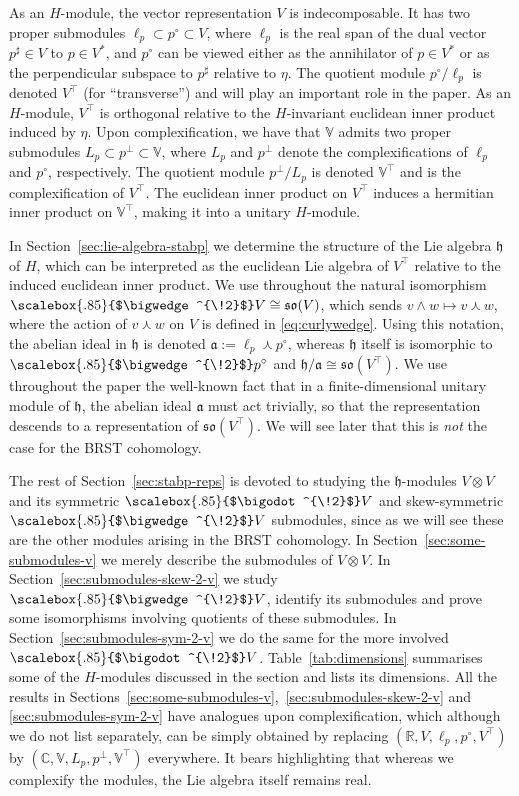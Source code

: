 \documentclass[11pt,reqno,a4paper,final]{amsart}
\newcommand\ext[1]{\scalebox{.85}{$\bigwedge^{\!#1}$}}
\newcommand\sym[1]{\scalebox{.85}{$\bigodot^{\!#1}$}}
\theoremstyle{plain}
\theoremstyle{definition}
\newcommand{\h}{\mathfrak{h}}
\newcommand{\fa}{\mathfrak{a}}
\newcommand{\so}{\mathfrak{so}}
\newcommand{\VV}{\mathbb{V}}
\newcommand{\RR}{\mathbb{R}}
\newcommand{\CC}{\mathbb{C}}
\newcommand{\1}{\mathbb{1}}
\numberwithin{equation}{section}
\begin{document}
As an $H$-module, the vector
representation $V$ is indecomposable. It has two proper submodules
$\ell_p \subset p^\circ \subset V$, where $\ell_p$ is the real span of
the dual vector $p^\sharp \in V$ to $p \in V^*$, and $p^\circ$ can be
viewed either as the annihilator of $p \in V^*$ or as the
perpendicular subspace to $p^\sharp$ relative to $\eta$. The quotient
module $p^\circ/\ell_p$ is denoted $V^\top$ (for ``transverse'') and
will play an important role in the paper. As an $H$-module, $V^\top$
is orthogonal relative to the $H$-invariant euclidean inner product
induced by $\eta$. Upon complexification, we have that $\VV$ admits
two proper submodules $L_p \subset p^\perp \subset \VV$, where $L_p$
and $p^\perp$ denote the complexifications of $\ell_p$ and $p^\circ$,
respectively. The quotient module $p^\perp/L_p$ is denoted $\VV^\top$
and is the complexification of $V^\top$. The euclidean inner product
on $V^\top$ induces a hermitian inner product on $\VV^\top$, making it
into a unitary $H$-module.

In Section~\ref{sec:lie-algebra-stabp} we determine the structure of
the Lie algebra $\h$ of $H$, which can be interpreted as the euclidean
Lie algebra of $V^\top$ relative to the induced euclidean inner
product.  We use throughout the natural isomorphism
$\ext{2}V \cong \so(V)$, which sends
$v \wedge w \mapsto v \curlywedge w$, where the action of
$v \curlywedge w$ on $V$ is defined in \eqref{eq:curlywedge}.  Using
this notation, the abelian ideal in $\h$ is denoted
$\fa:= \ell_p \curlywedge p^\circ$, whereas $\h$ itself is isomorphic
to $\ext{2}p^\circ$ and $\h/\fa \cong \so(V^\top)$.  We use throughout
the paper the well-known fact that in a finite-dimensional unitary
module of $\h$, the abelian ideal $\fa$ must act trivially, so that
the representation descends to a representation of $\so(V^\top)$.  We
will see later that this is \emph{not} the case for the BRST
cohomology.

The rest of Section~\ref{sec:stabp-reps} is devoted to studying the
$\h$-modules $V\otimes V$ and its symmetric $\sym{2}V$ and
skew-symmetric $\ext{2}V$ submodules, since as we will see these are
the other modules arising in the BRST cohomology.  In
Section~\ref{sec:some-submodules-v} we merely describe the submodules
of $V \otimes V$.  In Section~\ref{sec:submodules-skew-2-v} we study
$\ext{2}V$, identify its submodules and prove some isomorphisms
involving quotients of these submodules.  In
Section~\ref{sec:submodules-sym-2-v} we do the same for the more
involved $\sym{2}V$.  Table~\ref{tab:dimensions} summarises some of
the $H$-modules discussed in the section and lists its dimensions.
All the results in
Sections~\ref{sec:some-submodules-v},~\ref{sec:submodules-skew-2-v}
and \ref{sec:submodules-sym-2-v} have analogues upon
complexification, which although we do not list separately, can
be simply obtained by replacing $(\RR, V, \ell_p, p^\circ,V^\top)$ by
$(\CC,\VV,L_p, p^\perp,\VV^\top)$ everywhere.  It bears highlighting
that whereas we complexify the modules, the Lie algebra itself remains
real.
\end{document}
